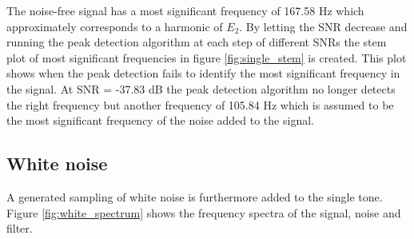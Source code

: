 The noise-free signal has a most significant frequency of 167.58 Hz which approximately corresponds to a harmonic of $E_2$. By letting the SNR decrease and running the peak detection algorithm at each step of different SNRs the stem plot of most significant frequencies in figure \ref{fig:single_stem} is created. This plot shows when the peak detection fails to identify the most significant frequency in the signal. At SNR = -37.83 dB the peak detection algorithm no longer detects the right frequency but another frequency of 105.84 Hz which is assumed to be the most significant frequency of the noise added to the signal.

\subsection{White noise}
A generated sampling of white noise is furthermore added to the single tone. Figure \ref{fig:white_spectrum} shows the frequency spectra of the signal, noise and filter.


